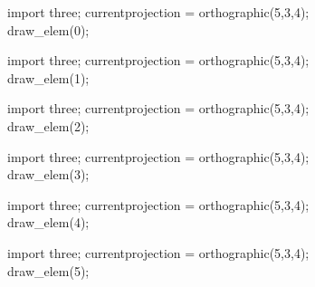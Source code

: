 \documentclass[../gatm_answers.tex]{subfiles}
\begin{document}
\begin{figure}[h]
	\begin{center}
		\begin{minipage}[b]{0.3\textwidth}
			\centering
			\begin{asy}[width=0.8\textwidth]
				import three;
				currentprojection = orthographic(5,3,4);
				draw_elem(0);
			\end{asy}
		\end{minipage}
		\hfill
		\begin{minipage}[b]{0.3\textwidth}
			\centering
			\begin{asy}[width=0.8\textwidth]
				import three;
				currentprojection = orthographic(5,3,4);
				draw_elem(1);
			\end{asy}
		\end{minipage}
		\hfill
		\begin{minipage}[b]{0.3\textwidth}
			\centering
			\begin{asy}[width=0.8\textwidth]
				import three;
				currentprojection = orthographic(5,3,4);
				draw_elem(2);
			\end{asy}
		\end{minipage}
	\end{center}

	\begin{center}
		\begin{minipage}[b]{0.3\textwidth}
			\centering
			\begin{asy}[width=0.8\textwidth]
				import three;
				currentprojection = orthographic(5,3,4);
				draw_elem(3);
			\end{asy}
		\end{minipage}
		\hfill
		\begin{minipage}[b]{0.3\textwidth}
			\centering
			\begin{asy}[width=0.8\textwidth]
				import three;
				currentprojection = orthographic(5,3,4);
				draw_elem(4);
			\end{asy}
		\end{minipage}
		\hfill
		\begin{minipage}[b]{0.3\textwidth}
			\centering
			\begin{asy}[width=0.9\textwidth]
				import three;
				currentprojection = orthographic(5,3,4);
				draw_elem(5);
			\end{asy}
		\end{minipage}
	\end{center}
\end{figure}
\end{document}
